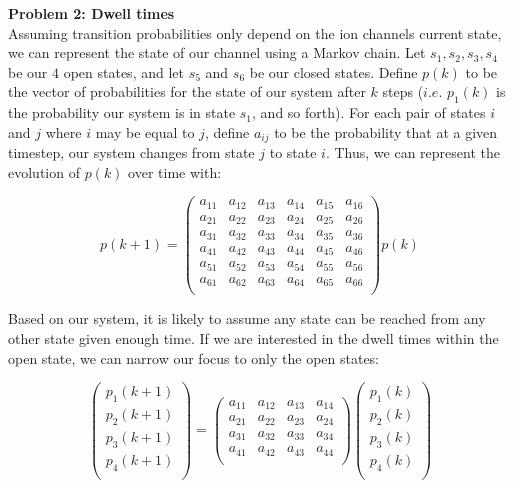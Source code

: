 \documentclass[12pt,a4paper]{article}
\begin{document}
\textbf{Problem 2: Dwell times}\\


Assuming transition probabilities only depend on the ion channels current state, we can represent the state of our channel using a Markov chain. Let $s_1,s_2,s_3,s_4$ be our $4$ open states, and let $s_5$ and $s_6$ be our closed states. Define $p(k)$ to be the vector of probabilities for the state of our system after $k$ steps ($i.e.$ $p_1(k)$ is the probability our system is in state $s_1$, and so forth). For each pair of states $i$ and $j$ where $i$ may be equal to $j$, define $a_{ij}$ to be the probability that at a given timestep, our system changes from state $j$ to state $i$. Thus, we can represent the evolution of $p(k)$ over time with:


$$p(k+1) = \begin{pmatrix}
a_{11} & a_{12} & a_{13} & a_{14} & a_{15} & a_{16} \\
a_{21} & a_{22} & a_{23} & a_{24} & a_{25} & a_{26} \\
a_{31} & a_{32} & a_{33} & a_{34} & a_{35} & a_{36} \\
a_{41} & a_{42} & a_{43} & a_{44} & a_{45} & a_{46} \\
a_{51} & a_{52} & a_{53} & a_{54} & a_{55} & a_{56} \\
a_{61} & a_{62} & a_{63} & a_{64} & a_{65} & a_{66} \\
\end{pmatrix}  p(k)
$$

Based on our system, it is likely to assume any state can be reached from any other state given enough time. If we are interested in the dwell times within the open state, we can narrow our focus to only the open states:

$$\begin{pmatrix}
p_1(k+1)\\
p_2(k+1)\\
p_3(k+1)\\
p_4(k+1)\\
\end{pmatrix} = \begin{pmatrix}
a_{11} & a_{12} & a_{13} & a_{14}\\
a_{21} & a_{22} & a_{23} & a_{24}\\
a_{31} & a_{32} & a_{33} & a_{34} \\
a_{41} & a_{42} & a_{43} & a_{44}\\

\end{pmatrix}  \begin{pmatrix}
p_1(k)\\
p_2(k)\\
p_3(k)\\
p_4(k)\\
\end{pmatrix} 
$$
\end{document}
